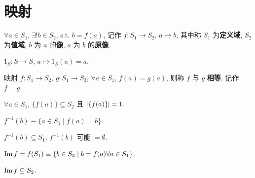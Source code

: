 \documentclass{note}
\begin{document}
\section{映射}
\begin{df}[映射]
    $\forall a\in S_1$, $\exists!b\in S_2$, s.t. $b=f(a)$, 记作 $f:S_1\rightarrow S_2$, $a\mapsto b$, 其中称 $S_1$ 为\textbf{定义域}, $S_2$ 为\textbf{值域}, $b$ 为 $a$ 的\textbf{像}, $a$ 为 $b$ 的\textbf{原像}.
\end{df}

\begin{eg}[恒等映射]
    $1_S:S\rightarrow S$, $a\mapsto 1_S(a)=a$.
\end{eg}

\begin{df}[映射相等]
    映射 $f:S_1\rightarrow S_2$, $g:S_1\rightarrow S_3$, $\forall a\in S_1$, $f(a)=g(a)$, 则称 $f$ 与 $g$ \textbf{相等}, 记作 $f=g$.
\end{df}

$\forall a\in S_1$, $\{f(a)\}\subseteq S_2$ 且 $\left\lvert\{f(a)\}\right\rvert=1$.

\begin{df}[原像集]
    $f^{-1}(b)\equiv\{a\in S_1\mid f(a)=b\}$.
\end{df}

$f^{-1}(b)\subseteq S_1$, $f^{-1}(b)$ 可能 $=\emptyset$.

\begin{df}[像集]
    $\operatorname{Im} f=f(S_1)\equiv\{b\in S_2\mid b=f(a)\forall a\in S_1\}$.
\end{df}

$\operatorname{Im} f\subseteq S_2$.
\end{document}

